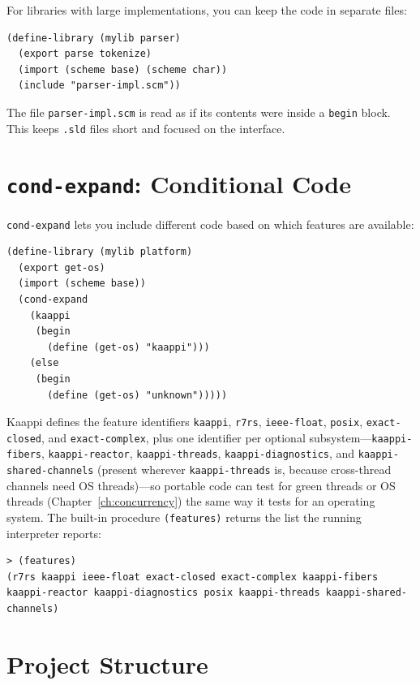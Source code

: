 For libraries with large implementations, you can keep the code in separate files:

\begin{lstlisting}
(define-library (mylib parser)
  (export parse tokenize)
  (import (scheme base) (scheme char))
  (include "parser-impl.scm"))
\end{lstlisting}

The file \texttt{parser-impl.scm} is read as if its contents were inside a \texttt{begin} block. This keeps \texttt{.sld} files short and focused on the interface.

\section{\texttt{cond-expand}: Conditional Code}

\texttt{cond-expand} lets you include different code based on which features are available:

\begin{lstlisting}
(define-library (mylib platform)
  (export get-os)
  (import (scheme base))
  (cond-expand
    (kaappi
     (begin
       (define (get-os) "kaappi")))
    (else
     (begin
       (define (get-os) "unknown")))))
\end{lstlisting}

Kaappi defines the feature identifiers \texttt{kaappi}, \texttt{r7rs}, \texttt{ieee-float}, \texttt{posix}, \texttt{exact-closed}, and \texttt{exact-complex}, plus one identifier per optional subsystem---\texttt{kaappi-fibers}, \texttt{kaappi-reactor}, \texttt{kaappi-threads}, \texttt{kaappi-diagnostics}, and \texttt{kaappi-shared-channels} (present wherever \texttt{kaappi-threads} is, because cross-thread channels need OS threads)---so portable code can test for green threads or OS threads (Chapter~\ref{ch:concurrency}) the same way it tests for an operating system. The built-in procedure \texttt{(features)} returns the list the running interpreter reports:

\begin{lstlisting}[style=repl]
> (features)
(r7rs kaappi ieee-float exact-closed exact-complex kaappi-fibers kaappi-reactor kaappi-diagnostics posix kaappi-threads kaappi-shared-channels)
\end{lstlisting}

\section{Project Structure}

